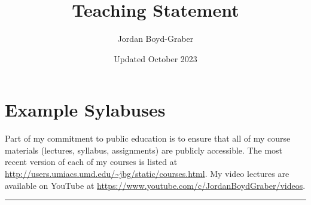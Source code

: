 \documentclass[11pt]{amsart}
\begin{document}
 \title{Teaching Statement}

 \author{Jordan Boyd-Graber}
\address{University of Maryland}


\date{Updated October 2023}

\maketitle



\section{Example Sylabuses}

Part of my commitment to public education is to ensure that all of my
course materials (lectures, syllabus, assignments) are publicly
accessible. The most recent version of each of my courses is listed at
\url{http://users.umiacs.umd.edu/~jbg/static/courses.html}.  My
video lectures are available on
YouTube at \url{https://www.youtube.com/c/JordanBoydGraber/videos}.



\clearpage




\noindent\rule{4cm}{0.4pt}
\end{document}
